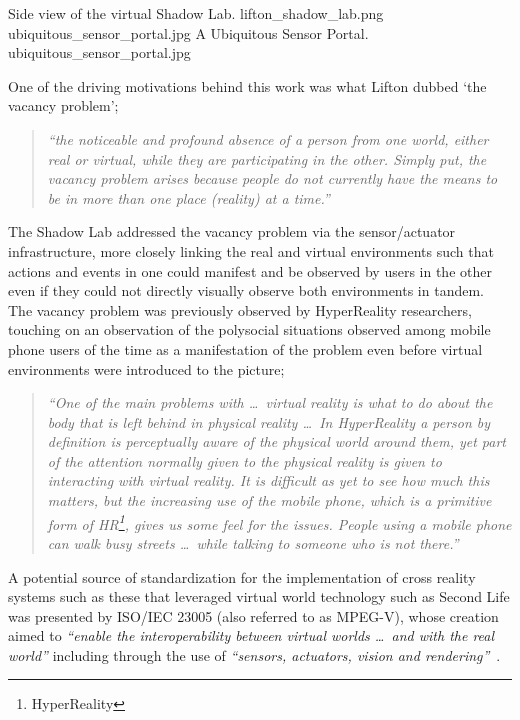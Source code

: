  {Side view of the virtual Shadow Lab.} {lifton_shadow_lab.png}
       {ubiquitous_sensor_portal.jpg} {A Ubiquitous Sensor Portal.} {ubiquitous_sensor_portal.jpg}

One of the driving motivations behind this work was what Lifton dubbed `the vacancy problem';

\begin{quote}
\textit{``the noticeable and profound absence of a person from one world, either real or virtual, while they are participating in the other. Simply put, the vacancy problem arises because people do not currently have the means to be in more than one place (reality) at a time.''}~\cite{Lifton2007a}
\end{quote}

The Shadow Lab addressed the vacancy problem via the sensor/actuator infrastructure, more closely linking the real and virtual environments such that actions and events in one could manifest and be observed by users in the other even if they could not directly visually observe both environments in tandem. The vacancy problem was previously observed by HyperReality researchers, touching on an observation of the polysocial situations observed among mobile phone users of the time as a manifestation of the problem even before virtual environments were introduced to the picture; %

\begin{quote}
	\textit{``One of the main problems with \ldots\ virtual reality is what to do about the body that is left behind in physical reality \ldots\ In HyperReality a person by definition is perceptually aware of the physical world around them, yet part of the attention normally given to the physical reality is given to interacting with virtual reality. It is difficult as yet to see how much this matters, but the increasing use of the mobile phone, which is a primitive form of HR\footnote{HyperReality}, gives us some feel for the issues. People using a mobile phone can walk busy streets \ldots\ while talking to someone who is not there.''}~\cite{Terashima2001}
\end{quote}

A potential source of standardization for the implementation of cross reality systems such as these that leveraged virtual world technology such as Second Life was presented by ISO/IEC 23005 (also referred to as MPEG-V), whose creation aimed to \textit{``enable the interoperability between virtual worlds \ldots\ and with the real world''} including through the use of \textit{``sensors, actuators, vision and rendering''}~\cite{InternationalOrganizationforStandardization2011}.


